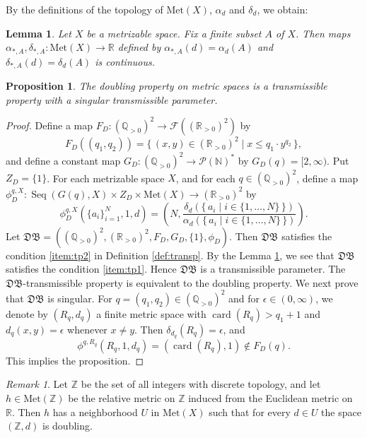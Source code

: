 \documentclass[a4paper, 12pt]{amsart}
\theoremstyle{plain}
\newtheorem{prop}[thm]{Proposition}
\newtheorem{lem}[thm]{Lemma}
\theoremstyle{definition}
\theoremstyle{remark}
\newtheorem{rmk}{Remark}[section]
\newcommand{\nn}{\mathbb{N}}
\newcommand{\zz}{\mathbb{Z}}
\newcommand{\qq}{\mathbb{Q}}
\newcommand{\rr}{\mathbb{R}}
\DeclareMathOperator{\card}{card}
\DeclareMathOperator{\seq}{Seq}
\newcommand{\met}[1]{\mathrm{Met}(#1)}
\begin{document}
By the definitions of the topology of 
$\met{X}$,  
$\alpha_{d}$ 
and 
$\delta_{d}$,  
we obtain:
\begin{lem}\label{lem:bdcon}
Let 
$X$ 
be a metrizable space. 
 Fix  a finite subset
  $A$ 
  of 
  $X$.  
Then maps 
$\alpha_{*, A}, \delta_{*, A}\colon \met{X}\to \rr$
 defined by 
$\alpha_{*, A}(d)=\alpha_{d}(A)$ 
and 
$\delta_{*, A}(d)=\delta_{d}(A)$ 
is continuous. 
\end{lem}
\begin{prop}\label{prop:doubling:241018}
The doubling property on metric spaces is a transmissible  property with a singular transmissible parameter. 
\end{prop}
\begin{proof}
Define a map 
$F_{D}\colon  (\qq_{>0})^2\to \mathcal{F}((\rr_{> 0})^{2})$
by 
\[
	F_{D}((q_1, q_2))
	=
	\{\, (x, y)\in (\rr_{> 0})^2\mid x\le q_{1}\cdot y^{q_{2}}\, \}, 
\]
and define a constant map 
$G_{D}\colon  (\qq_{>0})^{2}\to \mathcal{P}(\nn)^{*}$
by 
$G_{D}(q)=[2, \infty)$.
Put 
$Z_{D}=\{1\}$. 
For each metrizable space 
$X$, 
and for each 
$q\in (\qq_{>0})^2$, 
define a map 
$\phi_{D}^{q, X}\colon  
\seq(G(q), X)\times Z_{D}\times \met{X}\to (\rr_{> 0})^2$
by 
	\[
	\phi_{D}^{q, X}(\{a_{i}\}_{i=1}^{N}, 1, d)=
	\left(
	N, 
	\frac{\delta_{d}(\{\, a_{i}\mid i\in \{1, \dots, N\}\, \})}{\alpha_{d}(\{\, a_{i}\mid i\in \{1, \dots, N\}\, \})}
	\right). 
	\]
Let 
$\mathfrak{DB}=((\qq_{>0})^2, (\rr_{>0})^{2}, F_{D}, G_{D}, \{1\}, \phi_{D})$. 
Then 
$\mathfrak{DB}$ 
satisfies 
the condition
\ref{item:tp2}
in Definition 
\ref{def:transp}. 
By the Lemma
 \ref{lem:bdcon}, 
we see that
 $\mathfrak{DB}$
  satisfies the condition 
  \ref{item:tp1}. 
Hence
 $\mathfrak{DB}$
  is a transmissible  parameter. 
The
 $\mathfrak{DB}$-transmissible  property
  is equivalent to 
the doubling property. 
We next prove that 
$\mathfrak{DB}$ 
is singular. 
For  
$q=(q_{1}, q_{2})\in (\qq_{>0})^{2}$ 
and for 
$\epsilon\in (0, \infty)$, 
we denote by  
$(R_{q}, d_{q})$ 
a finite metric space with 
$\card(R_q)>q_{1}+1$
and 
$d_{q}(x, y)=\epsilon$
whenever $x\neq y$.  
Then 
$\delta_{d_q}(R_q)=\epsilon$,  
and 
	\[
	\phi^{q, R_q}(R_q, 1, d_q)=(\card(R_q), 1)\not\in F_{D}(q).
	\] 
This implies the proposition. 
\end{proof}
\begin{rmk}
Let 
$\zz$ 
be the set of all integers with discrete topology, 
and let 
$h\in \met{\zz}$ be 
the relative metric on 
$\zz$ 
induced from the Euclidean metric on 
 $\rr$. 
Then
 $h$ 
 has a neighborhood
  $U$ 
  in 
$\met{X}$ 
such that for every 
$d\in U$ 
the space  
$(\zz, d)$
is doubling. 
\end{rmk}
\end{document}
